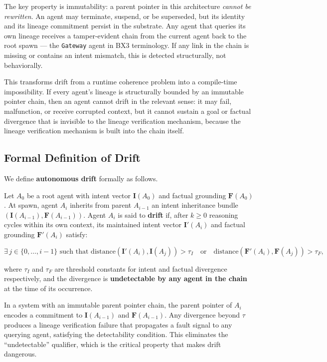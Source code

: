 The key property is immutability: a parent pointer in this architecture \textit{cannot be rewritten}. An agent may terminate, suspend, or be superseded, but its identity and its lineage commitment persist in the substrate. Any agent that queries its own lineage receives a tamper-evident chain from the current agent back to the root spawn — the \texttt{Gateway} agent in BX3 terminology. If any link in the chain is missing or contains an intent mismatch, this is detected structurally, not behaviorally.

This transforms drift from a runtime coherence problem into a compile-time impossibility. If every agent's lineage is structurally bounded by an immutable pointer chain, then an agent cannot drift in the relevant sense: it may fail, malfunction, or receive corrupted context, but it cannot sustain a goal or factual divergence that is invisible to the lineage verification mechanism, because the lineage verification mechanism is built into the chain itself.

\subsection{Formal Definition of Drift}

We define \textbf{autonomous drift} formally as follows.

Let $A_0$ be a root agent with intent vector $\mathbf{I}(A_0)$ and factual grounding $\mathbf{F}(A_0)$. At spawn, agent $A_i$ inherits from parent $A_{i-1}$ an intent inheritance bundle $(\mathbf{I}(A_{i-1}), \mathbf{F}(A_{i-1}))$. Agent $A_i$ is said to \textbf{drift} if, after $k \geq 0$ reasoning cycles within its own context, its maintained intent vector $\mathbf{I}'(A_i)$ and factual grounding $\mathbf{F}'(A_i)$ satisfy:

\[
\exists\, j \in \{0, \dots, i-1\} \text{ such that } \text{distance}(\mathbf{I}'(A_i), \mathbf{I}(A_j)) > \tau_I \quad \text{or} \quad \text{distance}(\mathbf{F}'(A_i), \mathbf{F}(A_j)) > \tau_F,
\]

where $\tau_I$ and $\tau_F$ are threshold constants for intent and factual divergence respectively, and the divergence is \textbf{undetectable by any agent in the chain} at the time of its occurrence.

In a system with an immutable parent pointer chain, the parent pointer of $A_i$ encodes a commitment to $\mathbf{I}(A_{i-1})$ and $\mathbf{F}(A_{i-1})$. Any divergence beyond $\tau$ produces a lineage verification failure that propagates a fault signal to any querying agent, satisfying the detectability condition. This eliminates the ``undetectable'' qualifier, which is the critical property that makes drift dangerous.

